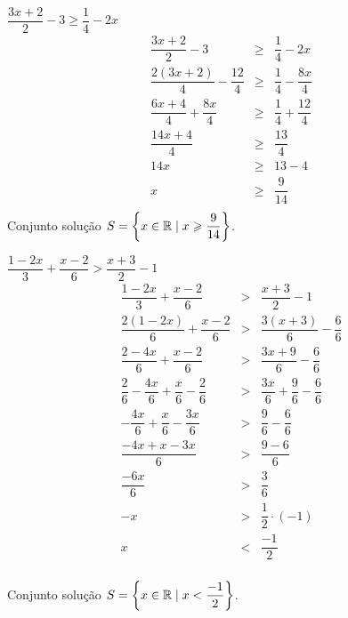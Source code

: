  \begin{exem}
 $\dfrac{3x+2}{2} - 3 \geqslant \dfrac{1}{4} - 2x$ 
 \begin{eqnarray*}
  \dfrac{3x+2}{2} - 3 &\geqslant & \dfrac{1}{4} - 2x \\
  \dfrac{2(3x+2)}{4} - \dfrac{12}{4} &\geqslant & \dfrac{1}{4} - \dfrac{8x}{4} \\
  \dfrac{6x+4}{4} + \dfrac{8x}{4} &\geqslant & \dfrac{1}{4} + \dfrac{12}{4} \\
  \dfrac{14x+4}{4}  &\geqslant & \dfrac{13}{4} \\
  14x  &\geqslant & 13 - 4\\
  x  &\geqslant & \dfrac{9}{14}\\
  \end{eqnarray*}
  Conjunto solução $S= \left\{x \in \mathbb{R} \mid x \geqslant \dfrac{9}{14} \right\}$.
 \end{exem}
 
\begin{exem}
$\dfrac{1-2x}{3} + \dfrac{x-2}{6} > \dfrac{x+3}{2} - 1$
  \begin{eqnarray*}
  \dfrac{1-2x}{3} + \dfrac{x-2}{6} &>& \dfrac{x+3}{2} - 1 \\
  \dfrac{2(1-2x)}{6} + \dfrac{x-2}{6} &>& \dfrac{3(x+3)}{6} - \dfrac{6}{6} \\
  \dfrac{2 - 4x}{6} + \dfrac{x-2}{6} &>& \dfrac{3x+9}{6} - \dfrac{6}{6} \\
  \dfrac{2}{6}- \dfrac{4x}{6}+ \dfrac{x}{6}- \dfrac{2}{6} &>& \dfrac{3x}{6}+ \dfrac{9}{6} - \dfrac{6}{6} \\
  - \dfrac{4x}{6} + \dfrac{x}{6} - \dfrac{3x}{6} &>& \dfrac{9}{6} - \dfrac{6}{6} \\
  \dfrac{-4x+x-3x}{6} &>& \dfrac{9-6}{6} \\
  \dfrac{-6x}{6} &>& \dfrac{3}{6} \\
  -x &>& \dfrac{1}{2} \cdot(-1)\\
   x &<& \dfrac{-1}{2} \\
  \end{eqnarray*}
 
 Conjunto solução $S=\left\{x \in \mathbb{R} \mid x < \dfrac{-1}{2} \right\}$.
\end{exem}

